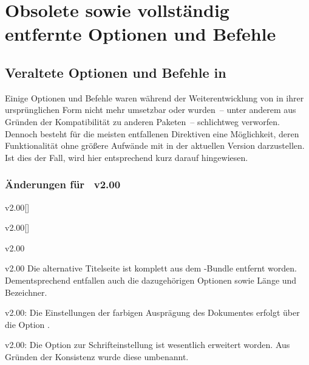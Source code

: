 \chapter{Obsolete sowie vollständig entfernte Optionen und Befehle}
%
%
\section{Veraltete Optionen und Befehle in \TUDScript}
Einige Optionen und Befehle waren während der Weiterentwicklung von \TUDScript
in ihrer ursprünglichen Form nicht mehr umsetzbar oder wurden~-- unter anderem 
aus Gründen der Kompatibilität zu anderen Paketen~-- schlichtweg verworfen. 
Dennoch besteht für die meisten entfallenen Direktiven eine Möglichkeit, deren 
Funktionalität ohne größere Aufwände mit \TUDScript in der aktuellen Version 
\vTUDScript{} darzustellen. Ist dies der Fall, wird hier entsprechend kurz 
darauf hingewiesen.


%
\subsection{Änderungen für \TUDScript~v2.00}
\begin{Obsolete}{v2.00}[]{}
\begin{Obsolete}{v2.00}[]{}
\begin{Obsolete}{v2.00}{}
\begin{Obsolete}{v2.00}{}
\printobsoletelist%
%
Die alternative Titelseite ist komplett aus dem \TUDScript-Bundle entfernt 
worden. Dementsprechend entfallen auch die dazugehörigen Optionen sowie Länge 
und Bezeichner.
\end{Obsolete}
\end{Obsolete}
\end{Obsolete}
\end{Obsolete}

\begin{Obsolete}{v2.00:}{}
\printobsoletelist%
%
Die Einstellungen der farbigen Ausprägung des Dokumentes erfolgt über die 
Option .
\end{Obsolete}

\begin{Obsolete}{v2.00:}{}
\printobsoletelist%
%
Die Option zur Schrifteinstellung ist wesentlich erweitert worden. Aus Gründen 
der Konsistenz wurde diese umbenannt.
\end{Obsolete}

